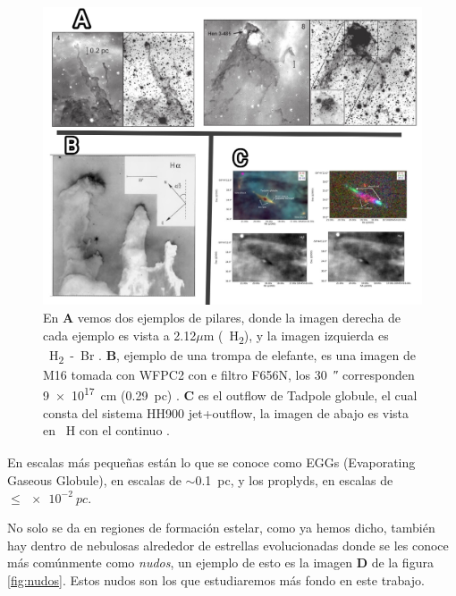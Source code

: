 \documentclass{book}
\begin{document}
\begin{figure}[h]
    \centering
    \includegraphics[width=1 \textwidth]{images Chapter 1/C1_Pillars.jpg}
    \caption{En \textbf{A} vemos dos ejemplos de pilares, donde la imagen derecha de cada ejemplo es vista a 2.12$\mu$m (\SI{}{H_2}), y la imagen izquierda es \SI{}{H_2-Br_{\gamma}} \citep{Hartigan:2015}. \textbf{B}, ejemplo de una trompa de elefante, es una imagen de M16 tomada con WFPC2 con e filtro F656N, los \SI{30}{\arcsecond} corresponden \SI{9e17}{cm} (\SI{0.29}{pc}) \citep{JJHester:1996}. \textbf{C} es el outflow de Tadpole globule, el cual consta del sistema HH900 jet+outflow, la imagen de abajo es vista en \SI{}{H_\alpha} con el continuo 
    \citep{MeganReiter:2019}. }
    \label{fig:Pillars}
\end{figure}

En escalas más pequeñas están lo que se conoce como EGGs (Evaporating Gaseous Globule), en escalas de $\sim$\SI{0.1}{pc}, y los proplyds, en escalas de $\le\SI{e-2}{pc}$. 

No solo se da en regiones de formación estelar, como ya hemos dicho, también hay dentro de nebulosas alrededor de estrellas evolucionadas donde se les conoce más comúnmente como \textit{nudos}, un ejemplo de esto es la imagen \textbf{D} de la figura \ref{fig:nudos}. Estos nudos son los que estudiaremos más fondo en este trabajo.
\end{document}
